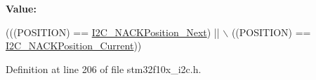 {\bfseries Value\+:}
\begin{DoxyCode}
(((POSITION) == \hyperlink{group___i2_c___n_c_a_k__position_gacb512a4bd4841a763b6ec51606687fca}{I2C\_NACKPosition\_Next}) || \(\backslash\)
                                         ((POSITION) == \hyperlink{group___i2_c___n_c_a_k__position_ga8d91c1e62730a9d927ca8e9ec4f7ef8f}{I2C\_NACKPosition\_Current}))
\end{DoxyCode}


Definition at line 206 of file stm32f10x\+\_\+i2c.\+h.

